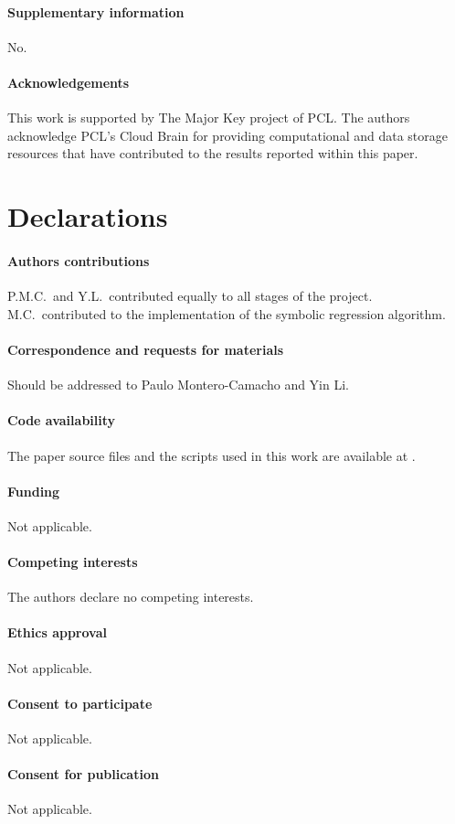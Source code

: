 \paragraph{\large Supplementary information} No.

\paragraph{\large Acknowledgements}
This work is supported by The Major Key project of PCL.
The authors acknowledge PCL's Cloud Brain for providing computational
and data storage resources that have contributed to the results reported
within this paper.

\section*{Declarations}

\paragraph{\large Authors contributions}
P.M.C.\ and Y.L.\ contributed equally to all stages of the project.
M.C.\ contributed to the implementation of the symbolic regression
algorithm.

\paragraph{\large Correspondence and requests for materials}
Should be addressed to Paulo Montero-Camacho and Yin Li.

\paragraph{\large Code availability}
The paper source files and the scripts used in this work are available
at \href{https://github.com/eelregit/5par}{\faGithub}.

\paragraph{\large Funding}
Not applicable.

\paragraph{\large Competing interests}
The authors declare no competing interests.

\paragraph{\large Ethics approval}
Not applicable.

\paragraph{\large Consent to participate}
Not applicable.

\paragraph{\large Consent for publication}
Not applicable.
